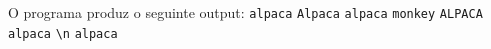 \documentclass[12pt,varwidth=16cm,border=1pt]{standalone}
\begin{document}
O programa produz o seguinte output: 
\newline
\verb+alpaca+ \newline
\verb+Alpaca+ \newline
\verb+alpaca+ \verb+monkey+ \newline
\verb+ALPACA+ \newline
\verb+alpaca+ \newline
\verb+\n+     \newline
\verb+alpaca+
\end{document}

